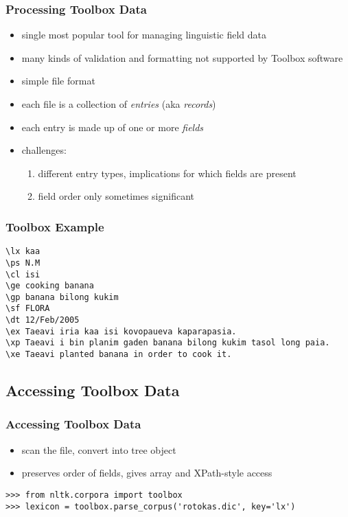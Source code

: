 \documentclass{beamer}             %
\begin{document}
\begin{frame}
\frametitle{Processing Toolbox Data}

\begin{itemize}
\item single most popular tool for managing linguistic field data
\item many kinds of validation and formatting not supported by Toolbox software
\item simple file format
\item each file is a collection of \textit{entries} (aka
  \textit{records})
\item each entry is made up of one or more \textit{fields}
\item challenges:
  \begin{enumerate}
  \item different entry types, implications for which fields are present
  \item field order only sometimes significant
  \end{enumerate}
\end{itemize}
\end{frame}

\begin{frame}[fragile]
\frametitle{Toolbox Example}
\small

\begin{verbatim}
\lx kaa
\ps N.M
\cl isi
\ge cooking banana
\gp banana bilong kukim
\sf FLORA
\dt 12/Feb/2005
\ex Taeavi iria kaa isi kovopaueva kaparapasia.
\xp Taeavi i bin planim gaden banana bilong kukim tasol long paia.
\xe Taeavi planted banana in order to cook it.
\end{verbatim}
\end{frame}

\subsection{Accessing Toolbox Data}

\begin{frame}[fragile]
\frametitle{Accessing Toolbox Data}

\begin{itemize}
\item scan the file, convert into tree object
\item preserves order of fields, gives array and XPath-style access
\end{itemize}

\small
\begin{verbatim}
>>> from nltk.corpora import toolbox
>>> lexicon = toolbox.parse_corpus('rotokas.dic', key='lx')
\end{verbatim}
\end{frame}
\end{document}
